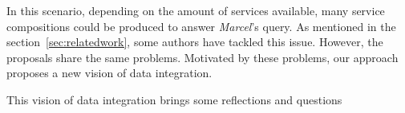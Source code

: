 In this scenario, depending on the amount of services available, many service compositions could be produced to answer \textit{Marcel}'s query. 
As mentioned in the section~\ref{sec:relatedwork}, some authors have tackled this issue. 
However, the proposals share the same problems.
Motivated by these problems, our approach proposes a new vision of data integration.

%
%
This vision of data integration brings some reflections and questions
